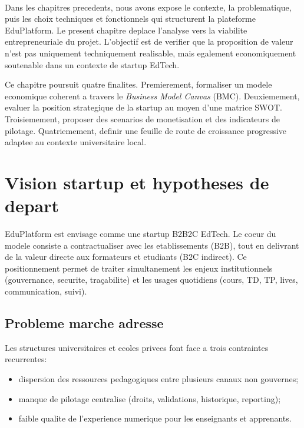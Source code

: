 ﻿﻿\documentclass[12pt,a4paper,oneside]{report}
\begin{document}
Dans les chapitres precedents, nous avons expose le contexte, la problematique, puis les choix techniques et fonctionnels qui structurent la plateforme EduPlatform. Le present chapitre deplace l'analyse vers la viabilite entrepreneuriale du projet. L'objectif est de verifier que la proposition de valeur n'est pas uniquement techniquement realisable, mais egalement economiquement soutenable dans un contexte de startup EdTech.

Ce chapitre poursuit quatre finalites. Premierement, formaliser un modele economique coherent a travers le \textit{Business Model Canvas} (BMC)\cite{osterwalder2010bmc}. Deuxiemement, evaluer la position strategique de la startup au moyen d'une matrice SWOT\cite{kotler2017marketing}. Troisiemement, proposer des scenarios de monetisation et des indicateurs de pilotage. Quatriemement, definir une feuille de route de croissance progressive adaptee au contexte universitaire local.

\section{Vision startup et hypotheses de depart}

EduPlatform est envisage comme une startup B2B2C EdTech. Le coeur du modele consiste a contractualiser avec les etablissements (B2B), tout en delivrant de la valeur directe aux formateurs et etudiants (B2C indirect). Ce positionnement permet de traiter simultanement les enjeux institutionnels (gouvernance, securite, traçabilite) et les usages quotidiens (cours, TD, TP, lives, communication, suivi).

\subsection{Probleme marche adresse}

Les structures universitaires et ecoles privees font face a trois contraintes recurrentes:
\begin{itemize}
  \item dispersion des ressources pedagogiques entre plusieurs canaux non gouvernes;
  \item manque de pilotage centralise (droits, validations, historique, reporting);
  \item faible qualite de l'experience numerique pour les enseignants et apprenants.
\end{itemize}
\end{document}
